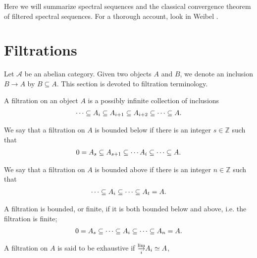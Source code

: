 \documentclass[../thesis.tex]{subfiles}
\begin{document}
    Here we will summarize spectral sequences and the classical convergence theorem of filtered spectral sequences. For a thorough account, look in Weibel \cite{Weibel94}.

    \section{Filtrations}
        Let $\mathcal{A}$ be an abelian category. Given two objects $A$ and $B$, we denote an inclusion $B \rightarrow A$ by $B \subseteq A$. This section is devoted to filtration terminology.

        \begin{definition}[Filtration]
            A filtration on an object $A$ is a possibly infinite collection of inclusions
            \begin{align*}
                \cdots \subseteq A_{i} \subseteq A_{i+1} \subseteq A_{i+2} \subseteq \cdots \subseteq A\tt{.}
            \end{align*}
        \end{definition}

        \begin{definition}
            We say that a filtration on $A$ is bounded below if there is an integer $s \in \mathbb{Z}$ such that
            \begin{align*}
                0 = A_s \subseteq A_{s+1} \subseteq \cdots A_i \subseteq \cdots \subseteq A\tt{.}
            \end{align*}

            We say that a filtration on $A$ is bounded above if there is an integer $n \in \mathbb{Z}$ such that
            \begin{align*}
                \cdots \subseteq A_i \subseteq \cdots \subseteq A_t = A\tt{.}
            \end{align*}

            A filtration is bounded, or finite, if it is both bounded below and above, i.e. the filtration is finite;
            \begin{align*}
                0 = A_s \subseteq \cdots \subseteq A_i \subseteq \cdots \subseteq A_n = A\tt{.}
            \end{align*}
        \end{definition}

        \begin{definition}
            A filtration on $A$ is said to be exhaustive if $\substack{\varinjlim \\ i} A_i \simeq A$,
            \begin{center}
            \end{center}
        \end{definition}
\end{document}

